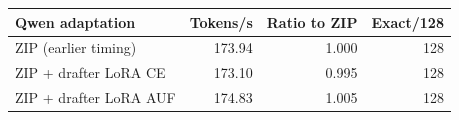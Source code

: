\begin{tabular}{lrrr}
\toprule
Qwen adaptation & Tokens/s & Ratio to ZIP & Exact/128 \\
\midrule
ZIP (earlier timing) & 173.94 & 1.000 & 128 \\
ZIP + drafter LoRA CE & 173.10 & 0.995 & 128 \\
ZIP + drafter LoRA AUF & 174.83 & 1.005 & 128 \\
\bottomrule
\end{tabular}
